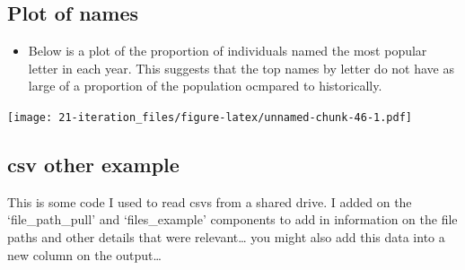 \documentclass[]{book}
\newenvironment{Shaded}{\begin{snugshade}}{\end{snugshade}}
\newcommand{\DataTypeTok}[1]{\textcolor[rgb]{0.13,0.29,0.53}{#1}}
\newcommand{\KeywordTok}[1]{\textcolor[rgb]{0.13,0.29,0.53}{\textbf{#1}}}
\newcommand{\NormalTok}[1]{#1}
\newcommand{\OperatorTok}[1]{\textcolor[rgb]{0.81,0.36,0.00}{\textbf{#1}}}
\newcommand{\StringTok}[1]{\textcolor[rgb]{0.31,0.60,0.02}{#1}}
\providecommand{\tightlist}{%
  \setlength{\itemsep}{0pt}\setlength{\parskip}{0pt}}
\theoremstyle{definition}
\theoremstyle{definition}
\theoremstyle{definition}
\theoremstyle{remark}
\begin{document}
\hypertarget{plot-of-names}{%
\subsection{Plot of names}\label{plot-of-names}}

\begin{itemize}
\tightlist
\item
  Below is a plot of the proportion of individuals named the most
  popular letter in each year. This suggests that the top names by
  letter do not have as large of a proportion of the population ocmpared
  to historically.
\end{itemize}

\begin{Shaded}
\end{Shaded}

\texttt{[image: 21-iteration\_files/figure-latex/unnamed-chunk-46-1.pdf]}

\hypertarget{csv-other-example}{%
\subsection{csv other example}\label{csv-other-example}}

This is some code I used to read csvs from a shared drive. I added on
the `file\_path\_pull' and `files\_example' components to add in
information on the file paths and other details that were
relevant\ldots{} you might also add this data into a new column on the
output\ldots{}
\end{document}
